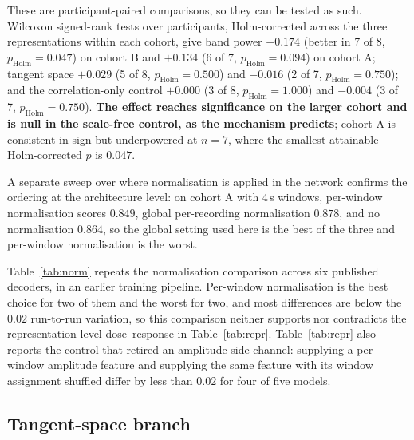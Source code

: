 \documentclass[a4paper,fleqn]{cas-dc}
\begin{document}
These are participant-paired comparisons, so they can be tested as such.
Wilcoxon signed-rank tests over participants, Holm-corrected across the three
representations within each cohort, give band power $+0.174$ (better in 7 of 8,
$p_{\mathrm{Holm}}=0.047$) on cohort B and $+0.134$ (6 of 7,
$p_{\mathrm{Holm}}=0.094$) on cohort A; tangent space $+0.029$ (5 of 8,
$p_{\mathrm{Holm}}=0.500$) and $-0.016$ (2 of 7, $p_{\mathrm{Holm}}=0.750$);
and the correlation-only control $+0.000$ (3 of 8, $p_{\mathrm{Holm}}=1.000$)
and $-0.004$ (3 of 7, $p_{\mathrm{Holm}}=0.750$). \textbf{The effect reaches
significance on the larger cohort and is null in the scale-free control, as
the mechanism predicts}; cohort A is consistent in sign but underpowered at
$n=7$, where the smallest attainable Holm-corrected $p$ is $0.047$.

A separate sweep over where normalisation is applied in the network confirms the
ordering at the architecture level: on cohort A with 4\,s windows, per-window
normalisation scores $0.849$, global per-recording normalisation $0.878$, and no
normalisation $0.864$, so the global setting used here is the best of the three
and per-window normalisation is the worst.

Table~\ref{tab:norm} repeats the normalisation comparison across six
published decoders, in an earlier training pipeline. Per-window normalisation is
the best choice for two of them and the worst for two, and most differences are
below the $0.02$ run-to-run variation, so this comparison neither supports nor
contradicts the representation-level dose--response in Table~\ref{tab:repr}.
Table~\ref{tab:repr} also reports the control that retired an amplitude
side-channel: supplying a per-window amplitude feature and supplying the same
feature with its window assignment shuffled differ by less than $0.02$ for four
of five models.

\subsection{Tangent-space branch}
\label{sec:tangent}
\end{document}

